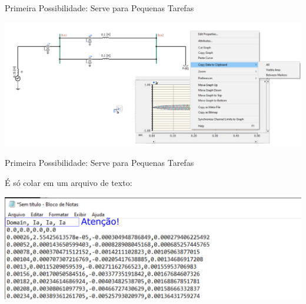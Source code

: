 \begin{frame}{Primeira Possibilidade: Serve para Pequenas Tarefas}
\centering

\includegraphics[width=0.95\linewidth]{./figuras/Exportacao/Export1}



\end{frame}




\begin{frame}{Primeira Possibilidade: Serve para Pequenas Tarefas}
\centering

É só colar em um arquivo de texto:

\includegraphics[width=0.95\linewidth]{./figuras/Exportacao/Export1-arquivo}



\end{frame}







